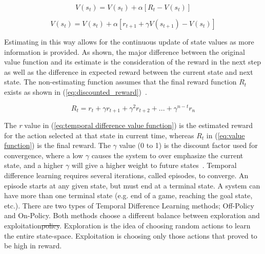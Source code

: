 \documentclass[12pt,american]{report}
\providecommand{\DIFdeltex}[1]{{\protect\color{red}\sout{#1}}}                      %
\providecommand{\DIFdelbegin}{} %
\providecommand{\DIFdelend}{} %
\providecommand{\DIFdel}[1]{\texorpdfstring{\DIFdeltex{#1}}{}} %
\newcommand{\DIFscaledelfig}{0.5}
\newlength{\DIFdelgraphicswidth} %
\newlength{\DIFdelgraphicsheight} %
\newcommand{\DIFdelincludegraphics}[2][]{%
\sbox{\DIFdelgraphicsbox}{\DIFOincludegraphics[#1]{#2}}%
\settoboxwidth{\DIFdelgraphicswidth}{\DIFdelgraphicsbox} %
\settoboxtotalheight{\DIFdelgraphicsheight}{\DIFdelgraphicsbox} %
\scalebox{\DIFscaledelfig}{%
\parbox[b]{\DIFdelgraphicswidth}{\usebox{\DIFdelgraphicsbox}\\[-\baselineskip] \rule{\DIFdelgraphicswidth}{0em}}\llap{\resizebox{\DIFdelgraphicswidth}{\DIFdelgraphicsheight}{%
\setlength{\unitlength}{\DIFdelgraphicswidth}%
\begin{picture}(1,1)%
\thicklines\linethickness{2pt} %
{\color[rgb]{1,0,0}\put(0,0){\framebox(1,1){}}}%
{\color[rgb]{1,0,0}\put(0,0){\line( 1,1){1}}}%
{\color[rgb]{1,0,0}\put(0,1){\line(1,-1){1}}}%
\end{picture}%
}\hspace*{3pt}}} %
} %
\DeclareRobustCommand{\DIFdelbegin}{\DIFOdelbegin \let\includegraphics\DIFdelincludegraphics} %
\DeclareRobustCommand{\DIFdelend}{\DIFOaddend \let\includegraphics\DIFOincludegraphics} %
\begin{document}
        \begin{equation}
            \label{eq:value function}
            V(s_{t}) = V(s_{t}) + \alpha[R_{t}-V(s_{t})]
        \end{equation}

        \begin{equation}
            \label{eq:temporal difference value function}
            V(s_{t}) = V(s_{t}) + \alpha[r_{t+1} + \gamma V(s_{t+1})-V(s_{t})]
        \end{equation}

        Estimating in this way allows for the continuous update of state values as more information is provided. As shown, the major difference between the original value function and its estimate is the consideration of the reward in the next step as well as the difference in expected reward between the current state and next state. The non-estimating function assumes that the final reward function \textit{$R_{t}$} exists as shown in (\ref{eq:discounted_reward})~\cite{matiisen_2015}.

        \begin{equation}
            \label{eq:discounted_reward}
            R_{t} = r_t + \gamma r_{t+1} + \gamma^2 r_{t+2} + ... + \gamma^{n-t}r_n 
        \end{equation}

        The \textit{r} value in (\ref{eq:temporal difference value function}) is the estimated reward for the action selected at that state in current time, whereas \textit{$R_t$} in (\ref{eq:value function}) is the final reward.  The \begin{math}\gamma\end{math} value (0 to 1) is the discount factor used for convergence, where a low \begin{math}\gamma\end{math} causes the system to over emphasize the current state, and a higher \begin{math}\gamma\end{math} will give a higher weight to future states~\cite{Eden}. Temporal difference learning requires several iterations, called episodes, to converge. An episode starts at any given state, but must end at a terminal state.  A system can have more than one terminal state (e.g. end of a game, reaching the goal state, etc.). There are two types of Temporal Difference Learning methods; Off-Policy and On-Policy.  Both methods choose a different balance between exploration and exploitation\DIFdelbegin \DIFdel{policy}\DIFdelend .  Exploration is the idea of choosing random actions to learn the entire state-space.  Exploitation is choosing only those actions that proved to be high in reward.
\end{document}
